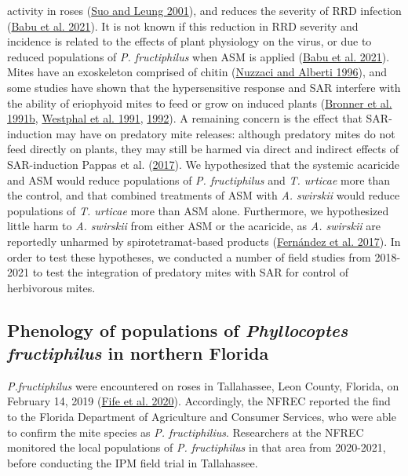 \documentclass{ufdissertation}[overrideChapters] %
\begin{document}
{activity in roses (\protect\hyperlink{ref-Suo2001}{Suo and Leung 2001}), and reduces the severity of RRD infection (\protect\hyperlink{ref-Babu2021}{Babu et al. 2021}). It is not known if this reduction in RRD severity and incidence is related to the effects of plant physiology on the virus, or due to reduced populations of \emph{P. fructiphilus} when ASM is applied (\protect\hyperlink{ref-Babu2021}{Babu et al. 2021}). Mites have an exoskeleton comprised of chitin (\protect\hyperlink{ref-Nuzzaci1996a}{Nuzzaci and Alberti 1996}), and some studies have shown that the hypersensitive response and SAR interfere with the ability of eriophyoid mites to feed or grow on induced plants (\protect\hyperlink{ref-Bronner1991a}{Bronner et al. 1991b}, \protect\hyperlink{ref-Westphal1991}{Westphal et al. 1991}, \protect\hyperlink{ref-Westphal1992}{1992}). A remaining concern is the effect that SAR-induction may have on predatory mite releases: although predatory mites do not feed directly on plants, they may still be harmed via direct and indirect effects of SAR-induction Pappas et al. (\protect\hyperlink{ref-Pappas2017}{2017}). We hypothesized that the systemic acaricide and ASM would reduce populations of \emph{P. fructiphilus} and \emph{T. urticae} more than the control, and that combined treatments of ASM with \emph{A. swirskii} would reduce populations of \emph{T. urticae} more than ASM alone. Furthermore, we hypothesized little harm to \emph{A. swirskii} from either ASM or the acaricide, as \emph{A. swirskii} are reportedly unharmed by spirotetramat-based products (\protect\hyperlink{ref-Fernandez2017}{Fernández et al. 2017}). In order to test these hypotheses, we conducted a number of field studies from 2018-2021 to test the integration of predatory mites with SAR for control of herbivorous mites.

\hypertarget{phenology-of-populations-of-phyllocoptes-fructiphilus-in-northern-florida}{%
\subsection{\texorpdfstring{Phenology of populations of \emph{Phyllocoptes fructiphilus} in northern Florida}{Phenology of populations of Phyllocoptes fructiphilus in northern Florida}}\label{phenology-of-populations-of-phyllocoptes-fructiphilus-in-northern-florida}}

\emph{P.fructiphilus} were encountered on roses in Tallahassee, Leon County, Florida, on February 14, 2019 (\protect\hyperlink{ref-Fife2020}{Fife et al. 2020}). Accordingly, the NFREC reported the find to the Florida Department of Agriculture and Consumer Services, who were able to confirm the mite species as \emph{P. fructiphilius}. Researchers at the NFREC monitored the local populations of \emph{P. fructiphilus} in that area from 2020-2021, before conducting the IPM field trial in Tallahassee.

}
\end{document}
